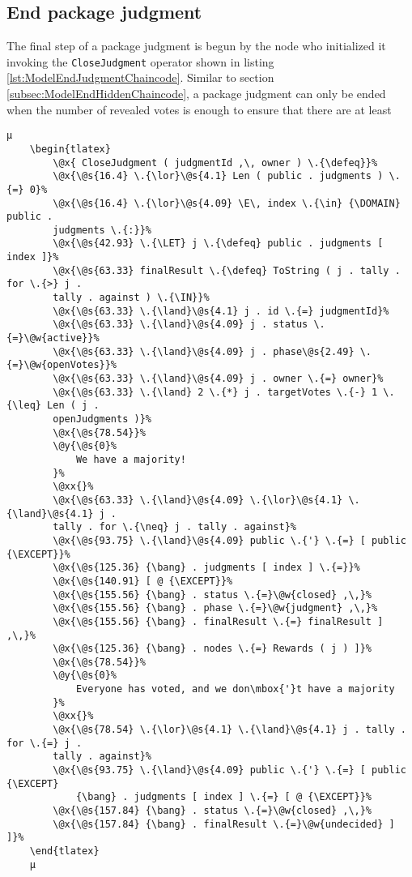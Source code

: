 \subsection{End package judgment}
\label{subsec:ModelEndJudgmentChaincode}

The final step of a package judgment is begun by the node who initialized it invoking the \texttt{CloseJudgment} operator shown in listing \ref{lst:ModelEndJudgmentChaincode}. Similar to section \ref{subsec:ModelEndHiddenChaincode}, a package judgment can only be ended when the number of revealed votes is enough to ensure that there are at least

\begin{lstlisting}[caption=Chaincode to end a package judgment, label=lst:ModelEndJudgmentChaincode]
	µ
	\begin{tlatex}
        \@x{ CloseJudgment ( judgmentId ,\, owner ) \.{\defeq}}%
        \@x{\@s{16.4} \.{\lor}\@s{4.1} Len ( public . judgments ) \.{=} 0}%
        \@x{\@s{16.4} \.{\lor}\@s{4.09} \E\, index \.{\in} {\DOMAIN} public .
        judgments \.{:}}%
        \@x{\@s{42.93} \.{\LET} j \.{\defeq} public . judgments [ index ]}%
        \@x{\@s{63.33} finalResult \.{\defeq} ToString ( j . tally . for \.{>} j .
        tally . against ) \.{\IN}}%
        \@x{\@s{63.33} \.{\land}\@s{4.1} j . id \.{=} judgmentId}%
        \@x{\@s{63.33} \.{\land}\@s{4.09} j . status \.{=}\@w{active}}%
        \@x{\@s{63.33} \.{\land}\@s{4.09} j . phase\@s{2.49} \.{=}\@w{openVotes}}%
        \@x{\@s{63.33} \.{\land}\@s{4.09} j . owner \.{=} owner}%
        \@x{\@s{63.33} \.{\land} 2 \.{*} j . targetVotes \.{-} 1 \.{\leq} Len ( j .
        openJudgments )}%
        \@x{\@s{78.54}}%
        \@y{\@s{0}%
            We have a majority!
        }%
        \@xx{}%
        \@x{\@s{63.33} \.{\land}\@s{4.09} \.{\lor}\@s{4.1} \.{\land}\@s{4.1} j .
        tally . for \.{\neq} j . tally . against}%
        \@x{\@s{93.75} \.{\land}\@s{4.09} public \.{'} \.{=} [ public {\EXCEPT}}%
        \@x{\@s{125.36} {\bang} . judgments [ index ] \.{=}}%
        \@x{\@s{140.91} [ @ {\EXCEPT}}%
        \@x{\@s{155.56} {\bang} . status \.{=}\@w{closed} ,\,}%
        \@x{\@s{155.56} {\bang} . phase \.{=}\@w{judgment} ,\,}%
        \@x{\@s{155.56} {\bang} . finalResult \.{=} finalResult ] ,\,}%
        \@x{\@s{125.36} {\bang} . nodes \.{=} Rewards ( j ) ]}%
        \@x{\@s{78.54}}%
        \@y{\@s{0}%
            Everyone has voted, and we don\mbox{'}t have a majority
        }%
        \@xx{}%
        \@x{\@s{78.54} \.{\lor}\@s{4.1} \.{\land}\@s{4.1} j . tally . for \.{=} j .
        tally . against}%
        \@x{\@s{93.75} \.{\land}\@s{4.09} public \.{'} \.{=} [ public {\EXCEPT}
            {\bang} . judgments [ index ] \.{=} [ @ {\EXCEPT}}%
        \@x{\@s{157.84} {\bang} . status \.{=}\@w{closed} ,\,}%
        \@x{\@s{157.84} {\bang} . finalResult \.{=}\@w{undecided} ] ]}%
    \end{tlatex}
    µ
\end{lstlisting}

